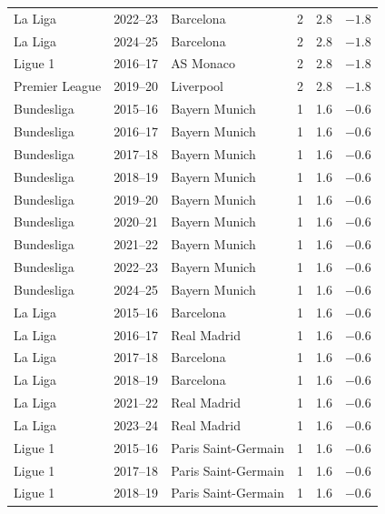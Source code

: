 \documentclass[11pt, a4paper]{article}
\begin{document}
\begin{longtable}{l l l c r r}
  La Liga        & 2022--23 & Barcelona                &  2 &  2.8 & $-1.8$ \\
  La Liga        & 2024--25 & Barcelona                &  2 &  2.8 & $-1.8$ \\
  Ligue 1        & 2016--17 & AS Monaco                &  2 &  2.8 & $-1.8$ \\
  Premier League & 2019--20 & Liverpool                &  2 &  2.8 & $-1.8$ \\
  Bundesliga     & 2015--16 & Bayern Munich            &  1 &  1.6 & $-0.6$ \\
  Bundesliga     & 2016--17 & Bayern Munich            &  1 &  1.6 & $-0.6$ \\
  Bundesliga     & 2017--18 & Bayern Munich            &  1 &  1.6 & $-0.6$ \\
  Bundesliga     & 2018--19 & Bayern Munich            &  1 &  1.6 & $-0.6$ \\
  Bundesliga     & 2019--20 & Bayern Munich            &  1 &  1.6 & $-0.6$ \\
  Bundesliga     & 2020--21 & Bayern Munich            &  1 &  1.6 & $-0.6$ \\
  Bundesliga     & 2021--22 & Bayern Munich            &  1 &  1.6 & $-0.6$ \\
  Bundesliga     & 2022--23 & Bayern Munich            &  1 &  1.6 & $-0.6$ \\
  Bundesliga     & 2024--25 & Bayern Munich            &  1 &  1.6 & $-0.6$ \\
  La Liga        & 2015--16 & Barcelona                &  1 &  1.6 & $-0.6$ \\
  La Liga        & 2016--17 & Real Madrid              &  1 &  1.6 & $-0.6$ \\
  La Liga        & 2017--18 & Barcelona                &  1 &  1.6 & $-0.6$ \\
  La Liga        & 2018--19 & Barcelona                &  1 &  1.6 & $-0.6$ \\
  La Liga        & 2021--22 & Real Madrid              &  1 &  1.6 & $-0.6$ \\
  La Liga        & 2023--24 & Real Madrid              &  1 &  1.6 & $-0.6$ \\
  Ligue 1        & 2015--16 & Paris Saint-Germain      &  1 &  1.6 & $-0.6$ \\
  Ligue 1        & 2017--18 & Paris Saint-Germain      &  1 &  1.6 & $-0.6$ \\
  Ligue 1        & 2018--19 & Paris Saint-Germain      &  1 &  1.6 & $-0.6$ \\

\end{longtable}
\end{document}
